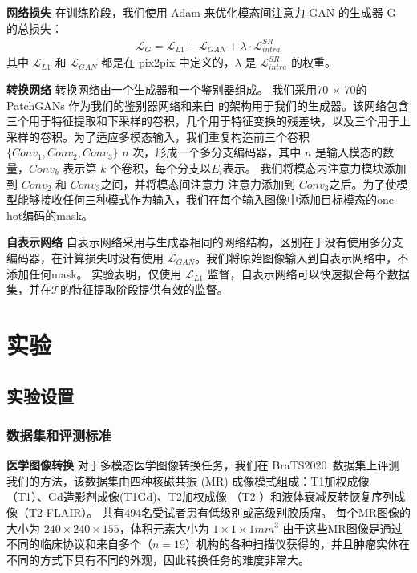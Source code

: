 \textbf{网络损失} 在训练阶段，我们使用 Adam 来优化模态间注意力-GAN 的生成器 G 的总损失：
\begin{align}
	\mathcal{L}_G = \mathcal{L}_{L1} + \mathcal{L}_{GAN} + \lambda  \cdot \mathcal{L}_{intra}^{SR}
\end{align}
其中 $\mathcal{L}_{L1}$ 和 $\mathcal{L}_{GAN}$ 都是在 pix2pix 中定义的，$\lambda$ 是 $\mathcal{L}_{intra}^{SR}$ 的权重。

\textbf{转换网络} 转换网络由一个生成器和一个鉴别器组成。 我们采用70 × 70的PatchGANs\cite{pix2pix} 作为我们的鉴别器网络和来自 \cite{perceptual} 的架构用于我们的生成器。该网络包含三个用于特征提取和下采样的卷积，几个用于特征变换的残差块，以及三个用于上采样的卷积。为了适应多模态输入，我们重复构造前三个卷积 $\{Conv_1, Conv_2, Conv_3\}$ $n$ 次，形成一个多分支编码器，其中 $n$ 是输入模态的数量，$ Conv_k$ 表示第 $k$ 个卷积，每个分支以$E_i$表示。 我们将模态内注意力模块添加到 $Conv_2$ 和 $Conv_3$之间，并将模态间注意力 注意力添加到 $Conv_3$之后。为了使模型能够接收任何三种模式作为输入，我们在每个输入图像中添加目标模态的one-hot编码的mask\cite{stargan}\cite{collagan}。

\textbf{自表示网络} 自表示网络采用与生成器相同的网络结构，区别在于没有使用多分支编码器，在计算损失时没有使用 $\mathcal{L}_{GAN}$。我们将原始图像输入到自表示网络中，不添加任何mask。 实验表明，仅使用 $\mathcal{L}_{L1}$ 监督，自表示网络可以快速拟合每个数据集，并在$\mathcal{T}$的特征提取阶段提供有效的监督。


\section{实验}

\subsection{实验设置}

\subsubsection{数据集和评测标准}

\textbf{医学图像转换}
对于多模态医学图像转换任务，我们在 BraTS2020~\cite{bakas2018identifying}数据集上评测我们的方法，该数据集由四种核磁共振 (MR) 成像模式组成：T1加权成像（T1）、Gd造影剂成像(T1Gd)、T2加权成像 （T2 ）和液体衰减反转恢复序列成像（T2-FLAIR）。 共有494名受试者患有低级别或高级别胶质瘤。 每个MR图像的大小为 $240\times240\times155$，体积元素大小为 $1\times 1\times 1 mm^3$ 由于这些MR图像是通过不同的临床协议和来自多个（$n=19$）机构的各种扫描仪获得的，并且肿瘤实体在不同的方式下具有不同的外观，因此转换任务的难度非常大。

